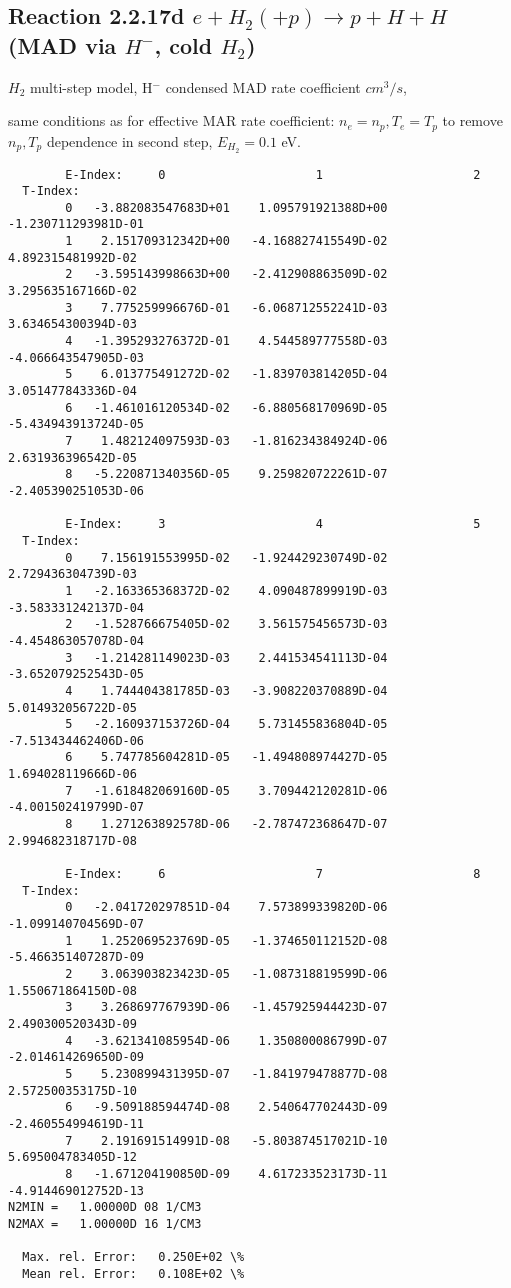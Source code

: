 \documentclass[12pt,dvipdfmx]{article}
\begin{document}
\subsection{
Reaction 2.2.17d   $e + H_2 (+p)   \rightarrow p + H + H  $ (MAD via $H^-$, cold $H_2$)
}

$H_2$ multi-step model, H$^-$ condensed MAD rate coefficient $cm^3/s$,

same conditions as for effective MAR rate coefficient: $n_e=n_p, T_e=T_p$ to remove $n_p,T_p$ dependence in second step,  $E_{H_2}=0.1$ eV.

\begin{small}\begin{verbatim}
        E-Index:     0                     1                     2
  T-Index:
        0   -3.882083547683D+01    1.095791921388D+00   -1.230711293981D-01
        1    2.151709312342D+00   -4.168827415549D-02    4.892315481992D-02
        2   -3.595143998663D+00   -2.412908863509D-02    3.295635167166D-02
        3    7.775259996676D-01   -6.068712552241D-03    3.634654300394D-03
        4   -1.395293276372D-01    4.544589777558D-03   -4.066643547905D-03
        5    6.013775491272D-02   -1.839703814205D-04    3.051477843336D-04
        6   -1.461016120534D-02   -6.880568170969D-05   -5.434943913724D-05
        7    1.482124097593D-03   -1.816234384924D-06    2.631936396542D-05
        8   -5.220871340356D-05    9.259820722261D-07   -2.405390251053D-06

        E-Index:     3                     4                     5
  T-Index:
        0    7.156191553995D-02   -1.924429230749D-02    2.729436304739D-03
        1   -2.163365368372D-02    4.090487899919D-03   -3.583331242137D-04
        2   -1.528766675405D-02    3.561575456573D-03   -4.454863057078D-04
        3   -1.214281149023D-03    2.441534541113D-04   -3.652079252543D-05
        4    1.744404381785D-03   -3.908220370889D-04    5.014932056722D-05
        5   -2.160937153726D-04    5.731455836804D-05   -7.513434462406D-06
        6    5.747785604281D-05   -1.494808974427D-05    1.694028119666D-06
        7   -1.618482069160D-05    3.709442120281D-06   -4.001502419799D-07
        8    1.271263892578D-06   -2.787472368647D-07    2.994682318717D-08

        E-Index:     6                     7                     8
  T-Index:
        0   -2.041720297851D-04    7.573899339820D-06   -1.099140704569D-07
        1    1.252069523769D-05   -1.374650112152D-08   -5.466351407287D-09
        2    3.063903823423D-05   -1.087318819599D-06    1.550671864150D-08
        3    3.268697767939D-06   -1.457925944423D-07    2.490300520343D-09
        4   -3.621341085954D-06    1.350800086799D-07   -2.014614269650D-09
        5    5.230899431395D-07   -1.841979478877D-08    2.572500353175D-10
        6   -9.509188594474D-08    2.540647702443D-09   -2.460554994619D-11
        7    2.191691514991D-08   -5.803874517021D-10    5.695004783405D-12
        8   -1.671204190850D-09    4.617233523173D-11   -4.914469012752D-13
N2MIN =   1.00000D 08 1/CM3
N2MAX =   1.00000D 16 1/CM3

  Max. rel. Error:   0.250E+02 \%
  Mean rel. Error:   0.108E+02 \%

\end{verbatim}\end{small}
\end{document}
